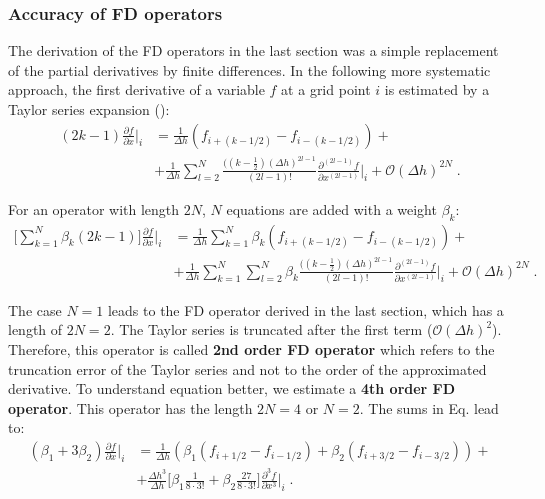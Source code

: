 \subsubsection{Accuracy of FD operators}
\label{accuracy}
The derivation of the FD operators in the last section was a simple replacement of the partial derivatives by finite differences. In the following more systematic approach, the first derivative of a variable $f$ at a grid point $i$ is estimated by a Taylor series expansion (\cite{jastram:92a}):
\begin{equation}
    \begin{split}
        (2k-1)\frac{\partial f}{\partial x}\biggr|_i &= \frac{1}{\Delta h}(f_{i+(k-1/2)}-f_{i-(k-1/2)}) + \\
        & +\frac{1}{\Delta h}\sum_{l=2}^N \frac{((k-\frac{1}{2}) (\Delta h)^{2l-1}}{(2l-1)!}\frac{\partial^{(2l-1)}f}{\partial
        x^{(2l-1)}}\biggr|_i+{\mathcal{O}}(\Delta h)^{2N}\;.
    \end{split}
\end{equation}

For an operator with length $2N$, $N$ equations are added with a weight $\beta_k$:
\begin{equation}
    \begin{split}
        \biggl[\sum_{k=1}^{N} \beta_k (2k-1)\biggr]\frac{\partial f}{\partial x}\biggr|_i &= \frac{1}{\Delta h} \sum_{k=1}^{N} \beta_k (f_{i+(k-1/2)}-f_{i-(k-1/2)}) +\\
        &+\frac{1}{\Delta h}\sum_{k=1}^{N} \sum_{l=2}^N \beta_k \frac{((k-\frac{1}{2})(\Delta h)^{2l-1}}{(2l-1)!}\frac{\partial^{(2l-1)}f}{\partial
        x^{(2l-1)}}\biggr|_i+{\mathcal{O}}(\Delta h)^{2N}\;.
    \end{split}
\end{equation}

The case $N=1$ leads to the FD operator derived in the last section, which has a length of $2N=2$. The Taylor series is truncated after the first term (${\mathcal{O}}(\Delta h)^{2}$). Therefore, this operator is called {\textbf{2nd order FD operator}} which refers to the truncation error of the Taylor series and not to the order of the approximated derivative. To understand equation %
better, we estimate a {\textbf{4th order FD operator}}. This operator has the length $2N=4$ or $N=2$. The sums in Eq. %
lead to:
\begin{equation}
    \begin{split}
        (\beta_1+3 \beta_2) \frac{\partial f}{\partial x}\biggr|_i &= \frac{1}{\Delta h}(\beta_1(f_{i+1/2}-f_{i-1/2})+\beta_2(f_{i+3/2}-f_{i-3/2})) +\\
        & +\frac{\Delta h^3}{\Delta h}\biggl[\beta_1\frac{1}{8 \cdot 3!}+\beta_2\frac{27}{8 \cdot 3!}\biggr]\frac{\partial^3 f}{\partial x^3}\biggr|_i\;.
    \end{split}
\end{equation}

